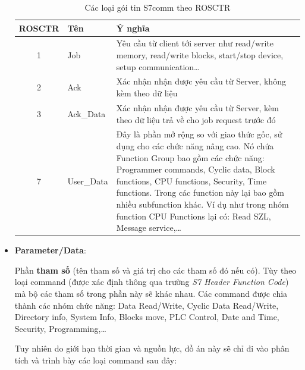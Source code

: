 \documentclass[../main.tex]{subfiles}
\begin{document}
\begin{itemize}
\begin{table}[H]
    \centering
    \caption{Các loại gói tin S7comm theo ROSCTR}
    \label{tab:rosctr}
    \footnotesize
    \begin{tabular}{|c|l|p{8.5cm}|}
        \hline
        \textbf{ROSCTR} & \textbf{Tên} & \textbf{Ý nghĩa} \\
        \hline
        1 & Job & Yêu cầu từ client tới server như read/write memory, read/write blocks, start/stop device, setup communication\ldots \\
        \hline
        2 & Ack & Xác nhận nhận được yêu cầu từ Server, không kèm theo dữ liệu \\
        \hline
        3 & Ack\_Data & Xác nhận nhận được yêu cầu từ Server, kèm theo dữ liệu trả về cho job request trước đó \\
        \hline
        7 & User\_Data & Đây là phần mở rộng so với giao thức gốc, sử dụng cho các chức năng nâng cao. Nó chứa Function Group bao gồm các chức năng: Programmer commands, Cyclic data, Block functions, CPU functions, Security, Time functions. Trong các function này lại bao gồm nhiều subfunction khác. Ví dụ như trong nhóm function CPU Functions lại có: Read SZL, Message service,\ldots \\
        \hline
    \end{tabular}
\end{table}

\item \textbf{Parameter/Data}:

Phần \textbf{tham số} (tên tham số và giá trị cho các tham số đó nếu có). Tùy theo loại command (được xác định thông qua trường \textit{S7 Header Function Code}) mà bộ các tham số trong phần này sẽ khác nhau. Các command được chia thành các nhóm chức năng: Data Read/Write, Cyclic Data Read/Write, Directory info, System Info, Blocks move, PLC Control, Date and Time, Security, Programming,\ldots

Tuy nhiên do giới hạn thời gian và nguồn lực, đồ án này sẽ chỉ đi vào phân tích và trình bày các loại command sau đây:

\begin{itemize}


\end{itemize}
\end{itemize}
\end{document}
